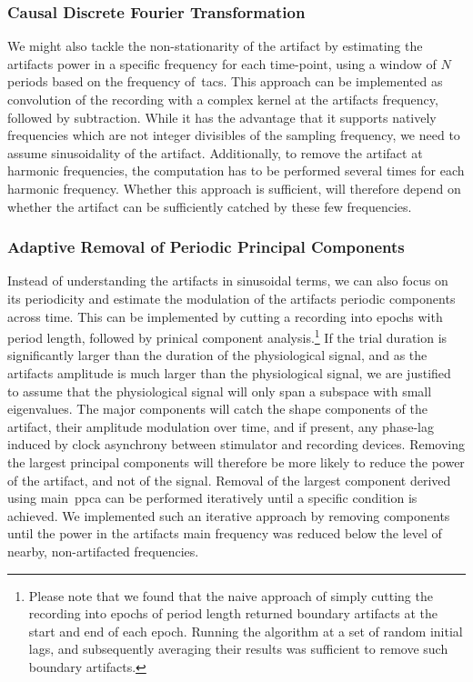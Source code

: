 \documentclass[a4paper]{article}
\begin{document}
\subsubsection{Causal Discrete Fourier Transformation}\label{sec:causalDFT}

We might also tackle the non-stationarity of the artifact by  estimating the artifacts power in a specific frequency for each time-point, using a window of $N$ periods based on the frequency of~\gls{tacs}. This approach can be implemented as convolution of the recording with a complex kernel at the artifacts frequency, followed by subtraction.
While it has the advantage that it supports natively frequencies which are not integer divisibles of the sampling frequency, we need to assume sinusoidality of the artifact. Additionally, to remove the artifact at harmonic frequencies, the computation has to be performed several times for each harmonic frequency.
Whether this approach is sufficient, will therefore depend on whether the artifact can be sufficiently catched by these few frequencies.

\subsubsection{Adaptive Removal of Periodic Principal Components}\label{sec:adaptivePCA}

Instead of understanding the artifacts in sinusoidal terms, we can also focus on its periodicity and estimate the modulation of the artifacts periodic components across time.
This can be implemented by cutting a recording into epochs with period length, followed by prinical component analysis.\footnote{Please note that we found that the naive approach of simply cutting the recording into epochs of period length returned boundary artifacts at the start and end of each epoch. Running the algorithm at a set of random initial lags, and subsequently averaging their results was sufficient to remove such boundary artifacts.}
If the trial duration is significantly larger than the duration of the physiological signal, and as the artifacts amplitude is much larger than the physiological signal, we are justified to assume that the physiological signal will only span a subspace with small eigenvalues.
The major components will catch the shape components of the artifact, their amplitude modulation over time, and if present, any phase-lag induced by clock asynchrony between stimulator and recording devices. Removing the largest principal components will therefore be more likely to reduce the power of the artifact, and not of the signal.
Removal of the largest component derived using main~\gls{ppca} can be performed iteratively until a specific condition is achieved. We implemented such an iterative approach by removing components until the power in the artifacts main frequency was reduced below the level of nearby, non-artifacted frequencies.
\end{document}

